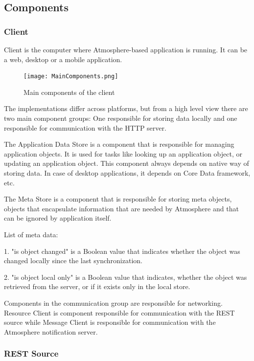 \subsection{Components}

\subsubsection{Client}

Client is the computer where Atmosphere-based application is running. It can be a web, desktop or a mobile application.

\begin{figure}[ht!]
\centering
\texttt{[image: MainComponents.png]}
\caption{Main components of the client \label{fig:3}}
\end{figure}

The implementations differ across platforms, but from a high level view there are two main component groups: One responsible for storing data locally and one responsible for communication with the HTTP server.

The Application Data Store is a component that is responsible for managing application objects. It is used for tasks like looking up an application object, or updating an application object. This component always depends on native way of storing data. In case of desktop applications, it depends on Core Data framework, etc. 

The Meta Store is a component that is responsible for storing meta objects, objects that encapsulate information that are needed by Atmosphere and that can be ignored by application itself.

List of meta data:

1. "is object changed" is a Boolean value that indicates whether the object was changed locally since the last synchronization. 

2. "is object local only" is a Boolean value that indicates, whether the object was retrieved from the server, or if it exists only in the local store. 

Components in the communication group are responsible for networking. Resource Client is component responsible for communication with the REST source while Message Client is responsible for communication with the Atmosphere notification server. 

\subsubsection{REST Source}

